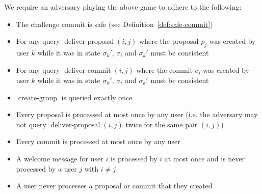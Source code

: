 \begin{definition}
	We require an adversary playing the above game to adhere to the following:
	\begin{itemize}
		\item The challenge commit is safe (see Definition~\vref{def:safe-commit}) 
		\item For any query $\operatorname{deliver-proposal}(i, j)$ where the proposal $p_j$ was created by user $k$ while it was in state $\sigma_k'$, $\sigma_i$ and $\sigma_k'$ must be consistent
		\item For any query $\operatorname{deliver-commit}(i, j)$ where the commit $c_j$ was created by user $k$ while it was in state $\sigma_k'$, $\sigma_i$ and $\sigma_k'$ must be consistent
		\item $\operatorname{create-group}$ is queried exactly once 
		\item Every proposal is processed at most once by any user (i.e. the adversary may not query $\operatorname{deliver-proposal}(i, j)$ twice for the same pair $(i, j)$)
		\item Every commit is processed at most once by any user
		\item A welcome message for user $i$ is processed by $i$ at most once and is never processed by a user $j$ with $i \neq j$
		\item A user never processes a proposal or commit that they created
	\end{itemize}

\end{definition}

